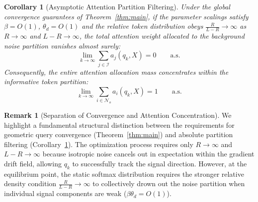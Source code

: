\documentclass[11pt,a4paper]{article}
\newtheorem{corollary}{Corollary}
\theoremstyle{definition}
\newtheorem{remark}{Remark}
\begin{document}
\begin{corollary}[Asymptotic Attention Partition Filtering] \label{corr:attention_partition}
 Under the global convergence guarantees of Theorem~\ref{thm:main}, if the parameter scalings satisfy $\beta=O(1)$, $ \theta_d = O(1)$ and the relative token distribution obeys $\frac{R}{L-R} \to \infty$ as $R \to \infty$ and $L-R \to \infty$, the total attention weight allocated to the background noise partition vanishes almost surely:
\begin{equation}
    \lim_{k \to \infty} \sum_{j \in \mathcal{I}} a_j(q_k, X) = 0 \qquad \text{a.s.}
\end{equation}
Consequently, the entire attention allocation mass concentrates within the informative token partition:
\begin{equation}
    \lim_{k \to \infty} \sum_{i \in \mathcal{N}_o} a_i(q_k,X) = 1 \qquad \text{a.s.}
\end{equation}
\end{corollary}
\begin{remark}[Separation of Convergence and Attention Concentration]
We highlight a fundamental structural distinction between the requirements for geometric query convergence (Theorem~\ref{thm:main}) and absolute partition filtering (Corollary~\ref{corr:attention_partition}). The optimization process requires only $R \to \infty$ and $L-R \to \infty$ because isotropic noise cancels out in expectation within the gradient drift field, allowing $q_k$ to successfully track the signal direction. However, at the equilibrium point, the static softmax distribution requires the stronger relative density condition $\frac{R}{L-R} \to \infty$ to collectively drown out the noise partition when individual signal components are weak ($\beta\theta_d = O(1)$).
\end{remark}
\end{document}
